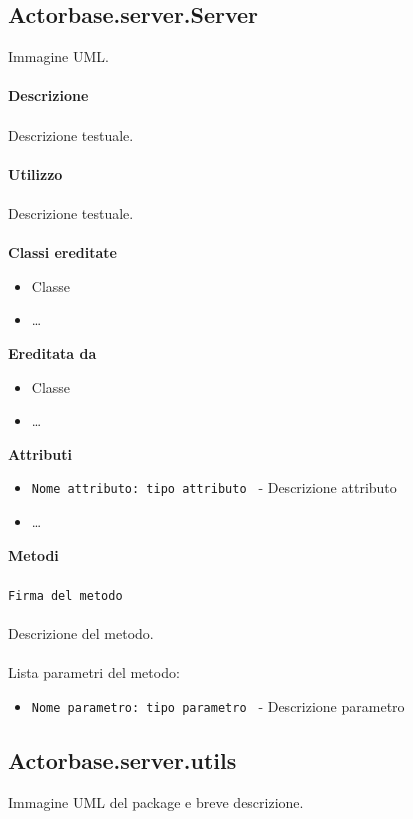 \documentclass[a4paper]{article}
\begin{document}
	\subsection{Actorbase.server.Server}
		Immagine UML.
		\\ \\
		\textbf{Descrizione}
			\\ \\
			Descrizione testuale.
			\\ \\
		\textbf{Utilizzo}
			\\ \\
			Descrizione testuale.
			\\ \\
		\textbf{Classi ereditate}
			\begin{itemize}
				\item Classe
				\item \dots
			\end{itemize}
		\textbf{Ereditata da}
			\begin{itemize}
				\item Classe
				\item \dots
			\end{itemize}
		\textbf{Attributi}
			\begin{itemize}
				\item \texttt{Nome attributo: tipo attributo } - Descrizione attributo
				\item \dots
			\end{itemize}
		\textbf{Metodi}
			\\ \\
			\texttt{Firma del metodo}
			\\ \\
			Descrizione del metodo.
			\\ \\
			Lista parametri del metodo:
			\begin{itemize}
				\item \texttt{Nome parametro: tipo parametro } - Descrizione parametro
			\end{itemize}
	
	\subsection{Actorbase.server.utils}
		Immagine UML del package e breve descrizione.
		
\end{document}
